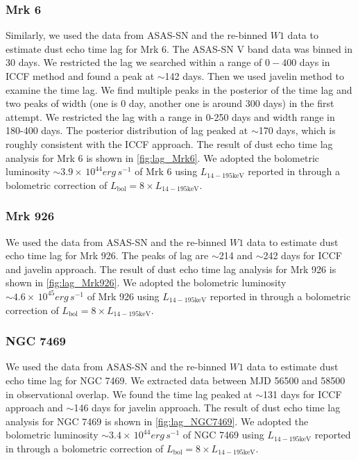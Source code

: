 \documentclass[linenumbers]{aastex631}
\begin{document}
\subsubsection{Mrk 6}
Similarly, we used the data from ASAS-SN and the re-binned $W1$ data to estimate dust echo time lag for Mrk 6. The ASAS-SN V band data was binned in 30 days. We restricted the lag we searched within a range of $0-400$ days in ICCF method and found a peak at $\sim$142 days. Then we used {\sc javelin} method to examine the time lag. We find multiple peaks in the posterior of the time lag and two peaks of width (one is 0 day, another one is around 300 days) in the first attempt. We restricted the lag with a range in 0-250 days and width range in 180-400 days. The posterior distribution of lag peaked at $\sim$170 days, which is roughly consistent with the ICCF approach. The result of dust echo time lag analysis for Mrk 6 is shown in \autoref{fig:lag_Mrk6}. We adopted the bolometric luminosity $\sim 3.9\times \, 10^{44} erg\, s^{-1}$ of Mrk 6 using $L_\mathrm{14-195 keV }$ reported in \citet{2018ApJS..235....4O} through a bolometric correction of $L_{\mathrm{bol}}=8 \times L_{\mathrm{14-195 keV }}$.




\subsubsection{Mrk 926}
We used the data from ASAS-SN and the re-binned $W1$ data to estimate dust echo time lag for Mrk 926. The peaks of lag are $\sim$214 and $\sim$242 days for ICCF and {\sc javelin} approach. The result of dust echo time lag analysis for Mrk 926 is shown in \autoref{fig:lag_Mrk926}. We adopted the bolometric luminosity $\sim 4.6\times \, 10^{45} erg\, s^{-1}$ of Mrk 926 using $L_\mathrm{14-195 keV }$ reported in \citet{2018ApJS..235....4O} through a bolometric correction of $L_{\mathrm{bol}}=8 \times L_{\mathrm{14-195 keV }}$.


\subsubsection{NGC 7469}
We used the data from ASAS-SN and the re-binned $W1$ data to estimate dust echo time lag for NGC 7469. We extracted data between MJD 56500 and 58500 in observational overlap. We found the time lag peaked at $\sim$131 days for ICCF approach and $\sim$146 days for {\sc javelin} approach. The result of dust echo time lag analysis for NGC 7469 is shown in \autoref{fig:lag_NGC7469}. We adopted the bolometric luminosity $\sim 3.4\times \, 10^{44} erg\, s^{-1}$ of NGC 7469 using $L_\mathrm{14-195 keV }$ reported in \citet{2018ApJS..235....4O} through a bolometric correction of $L_{\mathrm{bol}}=8 \times L_{\mathrm{14-195 keV }}$. 
\end{document}
